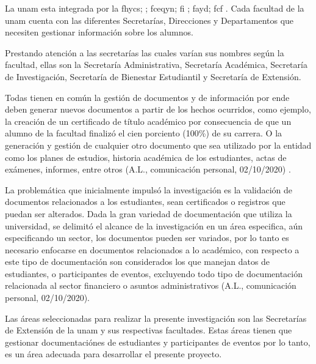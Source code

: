 La \gls{unam} esta integrada por la \gls{fhycs}; ; \gls{fceqyn}; \gls{fi} ; \gls{fayd};
\gls{fcf} 
\cite[]{estatuto}. Cada facultad de la \gls{unam} cuenta con las diferentes  Secretarías, Direcciones y Departamentos que necesiten gestionar información 
sobre los alumnos.

Prestando atención a las  secretarías las cuales varían sus nombres según la facultad, ellas son  la Secretaría Administrativa, 
Secretaría Académica, Secretaría de Investigación, Secretaría de Bienestar Estudiantil y Secretaría de Extensión.   

Todas  tienen en común  la gestión de  documentos y de información por ende deben generar nuevos documentos a partir de los 
hechos ocurridos, como ejemplo, la creación de un certificado de título académico por consecuencia de que un alumno de la facultad
finalizó el cien porciento (100\%) de su carrera. O la generación y gestión de cualquier otro documento que sea utilizado por 
la entidad como los planes de estudios, historia académica de los estudiantes, actas de exámenes, informes, entre otros (A.L., comunicación personal, 02/10/2020) \cite[]{estatuto}. 


La problemática que inicialmente impulsó la investigación es la validación de documentos relacionados a los estudiantes, sean certificados
o registros que puedan ser alterados. Dada la gran variedad de documentación que utiliza la universidad, se delimitó el alcance de la investigación en un área 
especifica, aún especificando un sector,
los documentos pueden ser variados, por lo tanto es necesario enfocarse en documentos relacionados a lo académico, con respecto a este tipo 
de documentación son considerados los que manejan datos de estudiantes, o participantes de eventos, excluyendo todo tipo de documentación 
relacionada al sector financiero  o asuntos administrativos (A.L., comunicación personal, 02/10/2020). %

Las áreas seleccionadas para realizar la presente investigación son las Secretarías de Extensión de la \gls{unam} y sus respectivas facultades. 
Estas áreas tienen que gestionar documentaciónes de estudiantes y participantes de eventos por lo tanto, es un área adecuada para desarrollar el presente proyecto.

